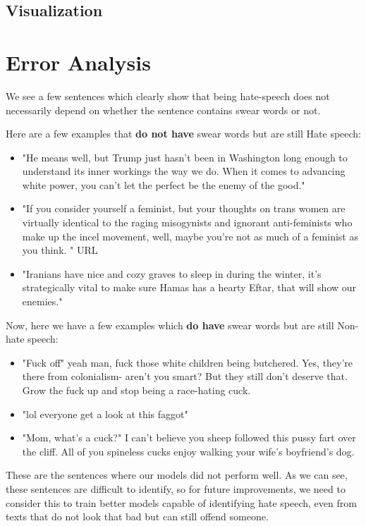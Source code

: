 \documentclass[a4paper, 10pt, conference]{IEEEtran}
\begin{document}
{{{\subsection{Visualization}


\section{Error Analysis}

We see a few sentences which clearly show that being hate-speech does not necessarily depend on whether the sentence contains swear words or not.

Here are a few examples that {\bf do not have} swear words but are still Hate speech:
\begin{itemize}
\item "He means well, but Trump just hasn't been in Washington long enough to understand its inner workings the way we do. When it comes to advancing white power, you can't let the perfect be the enemy of the good."
\item "If you consider yourself a feminist, but your thoughts on trans women are virtually identical to the raging misogynists and ignorant anti-feminists who make up the incel movement, well, maybe you're not as much of a feminist as you think. " URL
\item "Iranians have nice and cozy graves to sleep in during the winter, it's strategically vital to make sure Hamas has a hearty Eftar, that will show our enemies."\\
\end{itemize}
Now, here we have a few examples which {\bf do have} swear words but are still Non-hate speech:
\begin{itemize}
\item "Fuck off" yeah man, fuck those white children being butchered. Yes, they're there from colonialism- aren't you smart? But they still don't deserve that. Grow the fuck up and stop being a race-hating cuck.
\item "lol everyone get a look at this faggot"
\item "Mom, what's a cuck?" I can't believe you sheep followed this pussy fart over the cliff. All of you spineless cucks enjoy walking your wife's boyfriend's dog.
\end{itemize}

These are the sentences where our models did not perform well. As we can see, these sentences are difficult to identify, so for future improvements, we need to consider this to train better models capable of identifying hate speech, even from texts that do not look that bad but can still offend someone.



}}}
\end{document}
